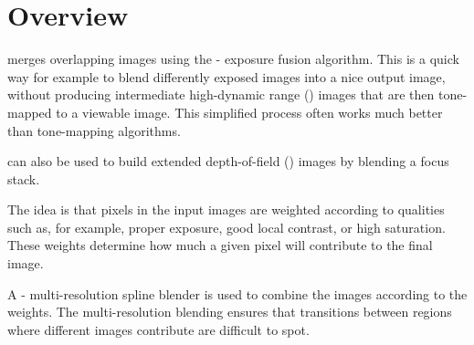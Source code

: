 

\chapter[Overview]{\label{sec:overview}%
  Overview}

%
%
%
%
%
%
%
\begin{sloppypar}
  \App{} merges overlapping images using the
  -\- exposure fusion
  algorithm.\footnotemark{} This is a quick way for example to blend differently exposed images
  into a nice output image, without producing intermediate high-dynamic range ()
  images that are then tone-mapped to a viewable image.  This simplified process often works much
  better than tone-mapping algorithms.%
\end{sloppypar}

%
%
\App{} can also be used to build extended depth-of-field () images by blending a
focus stack.

The idea is that pixels in the input images are weighted according to qualities such as, for
example, proper exposure, good local contrast, or high saturation.  These weights determine how
much a given pixel will contribute to the final image.

%
%
%
%
%
A - multi-resolution spline blender\footnotemark{} is used
to combine the images according to the weights.  The multi-resolution blending ensures that
transitions between regions where different images contribute are difficult to spot.%
%

